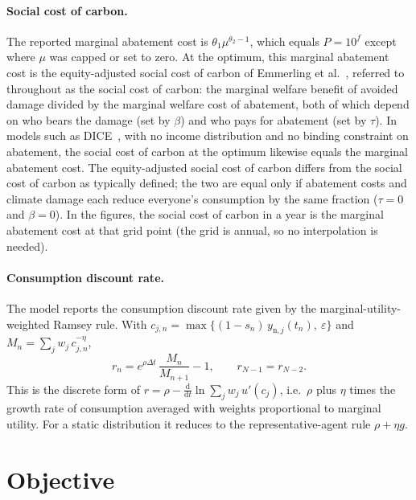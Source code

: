 \documentclass[11pt]{article}
\newcommand{\dd}{\mathrm{d}}
\begin{document}
\paragraph{Social cost of carbon.} The reported marginal abatement cost is
$\theta_1\mu^{\theta_2-1}$, which equals $P = 10^f$ except where $\mu$ was
capped or set to zero. At the optimum, this marginal abatement cost is the
equity-adjusted social cost of carbon of Emmerling et al.~\cite{Emmerling2026},
referred to throughout as the social cost of carbon: the marginal welfare
benefit of avoided damage divided by the marginal welfare cost of abatement,
both of which depend on who bears the damage (set by $\beta$) and who pays for
abatement (set by $\tau$). In models such as DICE~\cite{BarrageNordhaus2024},
with no income distribution and no binding constraint on abatement, the social
cost of carbon at the optimum likewise equals the marginal abatement cost. The
equity-adjusted social cost of carbon differs from the social cost of carbon as
typically defined; the two are equal only if abatement costs and climate
damage each reduce everyone's consumption by the same fraction ($\tau = 0$ and
$\beta = 0$). In the figures, the social cost of carbon in a year is the
marginal abatement cost at that grid point (the grid is annual, so no
interpolation is needed).

\paragraph{Consumption discount rate.} The model reports the consumption
discount rate given by the marginal-utility-weighted Ramsey rule. With
$c_{j,n} = \max\{(1-s_n)\,y_{\mathrm{n},j}(t_n),\ \varepsilon\}$ and
$M_n = \sum_j w_j\,c_{j,n}^{-\eta}$,
\begin{equation}
  r_n = e^{\rho\Delta t}\,\frac{M_n}{M_{n+1}} - 1,
  \qquad r_{N-1} = r_{N-2}.
  \label{eq:ramsey}
\end{equation}
This is the discrete form of $r = \rho - \frac{\dd}{\dd t}\ln\sum_j w_j\,
u'(c_j)$, i.e.\ $\rho$ plus $\eta$ times the growth rate of consumption
averaged with weights proportional to marginal utility. For a static
distribution it reduces to the representative-agent rule $\rho + \eta g$.

\section{Objective}
\label{sec:objective}
\end{document}

